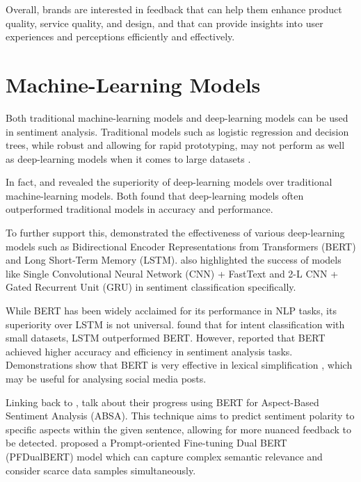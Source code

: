 Overall, brands are interested in feedback that can help them enhance product quality, service quality, and design, and that can provide insights into user experiences and perceptions efficiently and effectively.

\section{Machine-Learning Models}
Both traditional machine-learning models and deep-learning models can be used in sentiment analysis. Traditional models such as logistic regression and decision trees, while robust and allowing for rapid prototyping, may not perform as well as deep-learning models when it comes to large datasets \citep{rajnayak2017traditional}.

In fact, \citet{kansara2020comparison} and \citet{kamruzzaman2021comparative} revealed the superiority of deep-learning models over traditional machine-learning models. Both found that deep-learning models often outperformed traditional models in accuracy and performance.

To further support this, \citet{dhola2021comparative} demonstrated the effectiveness of various deep-learning models such as Bidirectional Encoder Representations from Transformers (BERT) and Long Short-Term Memory (LSTM). \citet{kamruzzaman2021comparative} also highlighted the success of models like Single Convolutional Neural Network (CNN) + FastText and 2-L CNN + Gated Recurrent Unit (GRU) in sentiment classification specifically.

While BERT has been widely acclaimed for its performance in NLP tasks, its superiority over LSTM is not universal. \citet{ezen2020comparison} found that for intent classification with small datasets, LSTM outperformed BERT. However, \citet{rangila2022sentiment} reported that BERT achieved higher accuracy and efficiency in sentiment analysis tasks. Demonstrations show that BERT is very effective in lexical simplification \citep{qiang2021lsbert}, which may be useful for analysing social media posts.

Linking back to \citet{d2019sentiment}, \citet{yin2023prompt} talk about their progress using BERT for Aspect-Based Sentiment Analysis (ABSA). This technique aims to predict sentiment polarity to specific aspects within the given sentence, allowing for more nuanced feedback to be detected. \citet{yin2023prompt} proposed a Prompt-oriented Fine-tuning Dual BERT (PFDualBERT) model which can capture complex semantic relevance and consider scarce data samples simultaneously.

